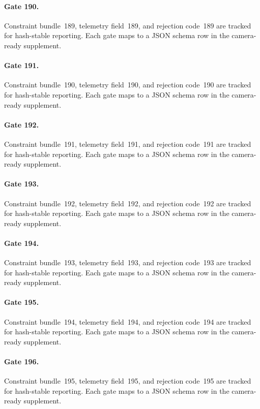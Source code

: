 \documentclass[sigconf,nonacm]{acmart}
\begin{document}
\paragraph{Gate 190.}
Constraint bundle~189, telemetry field~189, and rejection code~189 are tracked for hash-stable reporting. Each gate maps to a JSON schema row in the camera-ready supplement. %

\paragraph{Gate 191.}
Constraint bundle~190, telemetry field~190, and rejection code~190 are tracked for hash-stable reporting. Each gate maps to a JSON schema row in the camera-ready supplement. %

\paragraph{Gate 192.}
Constraint bundle~191, telemetry field~191, and rejection code~191 are tracked for hash-stable reporting. Each gate maps to a JSON schema row in the camera-ready supplement. %

\paragraph{Gate 193.}
Constraint bundle~192, telemetry field~192, and rejection code~192 are tracked for hash-stable reporting. Each gate maps to a JSON schema row in the camera-ready supplement. %

\paragraph{Gate 194.}
Constraint bundle~193, telemetry field~193, and rejection code~193 are tracked for hash-stable reporting. Each gate maps to a JSON schema row in the camera-ready supplement. %

\paragraph{Gate 195.}
Constraint bundle~194, telemetry field~194, and rejection code~194 are tracked for hash-stable reporting. Each gate maps to a JSON schema row in the camera-ready supplement. %

\paragraph{Gate 196.}
Constraint bundle~195, telemetry field~195, and rejection code~195 are tracked for hash-stable reporting. Each gate maps to a JSON schema row in the camera-ready supplement. %
\end{document}
